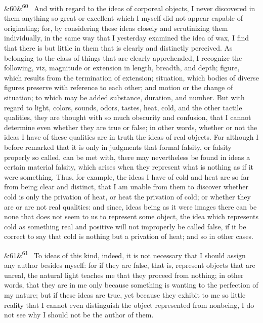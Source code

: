 \documentclass[12pt]{article}
\newcommand{\para}[1][]{\par\noindent\ifx&#1&\else\textsuperscript{\footnotesize #1}~\fi}
\begin{document}
\para[60] And with regard to the ideas of corporeal objects, I never discovered in them anything so great or excellent which I myself did not appear capable of originating; for, by considering these ideas closely and scrutinizing them individually, in the same way that I yesterday examined the idea of wax, I find that there is but little in them that is clearly and distinctly perceived. As belonging to the class of things that are clearly apprehended, I recognize the following, viz, magnitude or extension in length, breadth, and depth; figure, which results from the termination of extension; situation, which bodies of diverse figures preserve with reference to each other; and motion or the change of situation; to which may be added substance, duration, and number. But with regard to light, colors, sounds, odors, tastes, heat, cold, and the other tactile qualities, they are thought with so much obscurity and confusion, that I cannot determine even whether they are true or false; in other words, whether or not the ideas I have of these qualities are in truth the ideas of real objects. For although I before remarked that it is only in judgments that formal falsity, or falsity properly so called, can be met with, there may nevertheless be found in ideas a certain material falsity, which arises when they represent what is nothing as if it were something. Thus, for example, the ideas I have of cold and heat are so far from being clear and distinct, that I am unable from them to discover whether cold is only the privation of heat, or heat the privation of cold; or whether they are or are not real qualities: and since, ideas being as it were images there can be none that does not seem to us to represent some object, the idea which represents cold as something real and positive will not improperly be called false, if it be correct to say that cold is nothing but a privation of heat; and so in other cases.

\para[61] To ideas of this kind, indeed, it is not necessary that I should assign any author besides myself: for if they are false, that is, represent objects that are unreal, the natural light teaches me that they proceed from nothing; in other words, that they are in me only because something is wanting to the perfection of my nature; but if these ideas are true, yet because they exhibit to me so little reality that I cannot even distinguish the object represented from nonbeing, I do not see why I should not be the author of them.
\end{document}
